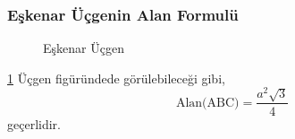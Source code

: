 \subsubsection{Eşkenar Üçgenin Alan Formulü}
\begin{figure}[h!]
    \centering
    \caption{Eşkenar Üçgen}
    \label{fig:equilatforarea}
\end{figure}

\ref{fig:equilatforarea} Üçgen figüründede görülebileceği gibi,
\begin{equation}
    \text{Alan(ABC)} = \frac{a^2 \sqrt{3}}{4}
\end{equation} 
geçerlidir.
